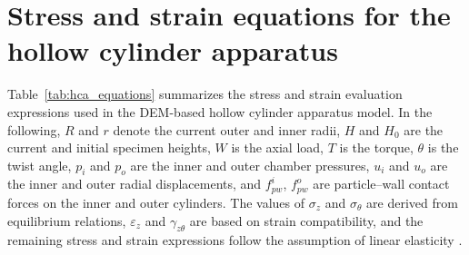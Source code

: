 \section{Stress and strain equations for the hollow cylinder apparatus}
\label{sec:appendix_hca}

Table~\ref{tab:hca_equations} summarizes the stress and strain evaluation expressions used in the DEM-based hollow cylinder apparatus model. In the following, $R$ and $r$ denote the current outer and inner radii, $H$ and $H_0$ are the current and initial specimen heights, $W$ is the axial load, $T$ is the torque, $\theta$ is the twist angle, $p_i$ and $p_o$ are the inner and outer chamber pressures, $u_i$ and $u_o$ are the inner and outer radial displacements, and $f_{pw}^{i}$, $f_{pw}^{o}$ are particle--wall contact forces on the inner and outer cylinders. The values of $\sigma_z$ and $\sigma_\theta$ are derived from equilibrium relations, $\varepsilon_z$ and $\gamma_{z\theta}$ are based on strain compatibility, and the remaining stress and strain expressions follow the assumption of linear elasticity \citep{Hight1983}.

